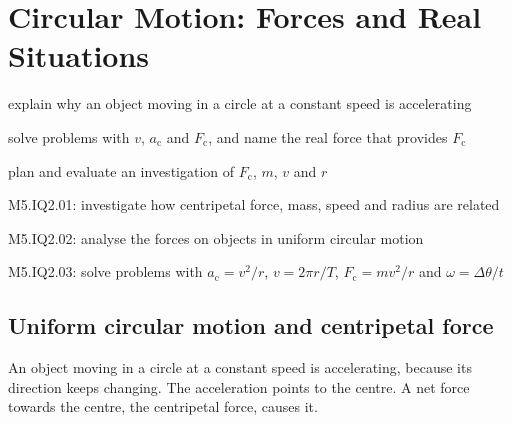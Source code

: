 \chapter[Circular Motion: Forces]{Circular Motion: Forces and Real Situations}\label{ch2:chap}


\begin{goals}
  \item explain why an object moving in a circle at a constant speed is accelerating
  \item solve problems with $v$, $a_\mathrm{c}$ and $F_\mathrm{c}$, and name the real force
        that provides $F_\mathrm{c}$
  \item plan and evaluate an investigation of $F_\mathrm{c}$, $m$, $v$ and $r$
\end{goals}

\begin{syllabus}
  \item M5.IQ2.01: investigate how centripetal force, mass, speed and radius are related
  \item M5.IQ2.02: analyse the forces on objects in uniform circular motion
  \item M5.IQ2.03: solve problems with $a_\mathrm{c} = v^2/r$, $v = 2\pi r/T$,
        $F_\mathrm{c} = mv^2/r$ and $\omega = \Delta\theta/t$
\end{syllabus}

\section{Uniform circular motion and centripetal force}\label{ch2:sec:ucm}

\begin{bigidea}
An object moving in a circle at a constant speed is accelerating, because its direction
keeps changing. The acceleration points to the centre. A net force towards the centre,
the centripetal force, causes it.
\end{bigidea}

\begin{keywords}
\end{keywords}

